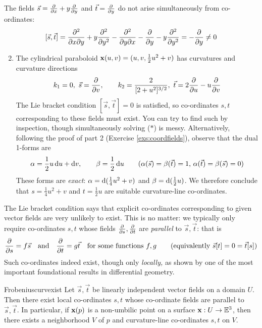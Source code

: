 \begin{examples}{}{}
	\exstart The fields $\vec s=\partials x+y\partials y$ and $\vec t=\partials y$ do not arise simultaneously from co-ordinates:
	\[
		[\vec s,\vec t]=\partials[^2]{x\partial y}+y\partials[^2]{y^2} -\partials[^2]{y\partial x}-\partials y-y\partials[^2]{y^2} =-\partials y\neq 0
	\]
	\begin{enumerate}\setcounter{enumi}{1}
	  \item The cylindrical paraboloid $\vx(u,v)=(u,v,\frac 12u^2+v)$ has curvatures and curvature directions
	  \[
	  	k_1=0, \ \vec s=\partials v,\qquad k_2=\frac 2{[2+u^2]^{3/2}},\  \vec t=2\partials u-u\partials v
	  \]
	  The Lie bracket condition $[\vec s,\vec t]=0$ is satisfied, so co-ordinates $s,t$ corresponding to these fields must exist. You can try to find such by inspection, though simultaneously solving ($\ast$) is messy. Alternatively, following the proof of part 2 (Exercise \ref{exs:coordfields}), observe that the dual 1-forms are
	  \[
	  	\alpha=\frac 12u\,\du+\dv, \qquad \beta=\frac 12\,\du  \tag{$\alpha(\vec s)=\beta(\vec t)=1$, $\alpha(\vec t)=\beta(\vec s)=0$}
	  \]
	  These forms are \emph{exact}: $\alpha=\D(\frac 14u^2+v)$ and $\beta=\D(\frac 12u)$. We therefore conclude that $s=\frac 14u^2+v$ and $t=\frac 12u$ are suitable curvature-line co-ordinates.
	\end{enumerate}
\end{examples}

The Lie bracket condition says that explicit co-ordinates corresponding to given vector fields are very unlikely to exist. This is no matter: we typically only require co-ordinates $s,t$ whose fields $\partials s,\partials t$ are \emph{parallel} to $\vec s,\vec t$: that is
\[
	\partials s=f\vec s \quad\text{and}\quad \partials t=g\vec t \quad \text{for some functions $f,g$} \tag{equivalently $\vec s[t]=0=\vec t[s]$}
\]
Such co-ordinates indeed exist, though only \emph{locally,} as shown by one of the most important foundational results in differential geometry.

\begin{thm}{Frobenius}{curvexist}
	Let $\vec s,\vec t$ be linearly independent vector fields on a domain $U$. Then there exist local co-ordinates $s,t$ whose co-ordinate fields are parallel to $\vec s,\vec t$.\smallbreak
	In particular, if $\vx(p)$ is a non-umbilic point on a surface $\vx:U\to\E^3$, then there exists a neighborhood $V$ of $p$ and curvature-line co-ordinates $s,t$ on $V$.
\end{thm}


